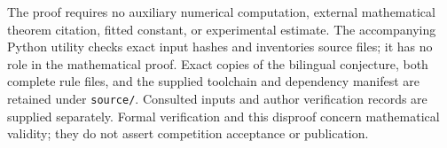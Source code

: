 \documentclass[11pt]{article}
\begin{document}
The proof requires no auxiliary numerical computation, external mathematical theorem citation, fitted constant, or experimental estimate. The accompanying Python utility checks exact input hashes and inventories source files; it has no role in the mathematical proof. Exact copies of the bilingual conjecture, both complete rule files, and the supplied toolchain and dependency manifest are retained under \texttt{source/}. Consulted inputs and author verification records are supplied separately. Formal verification and this disproof concern mathematical validity; they do not assert competition acceptance or publication.
\end{document}
